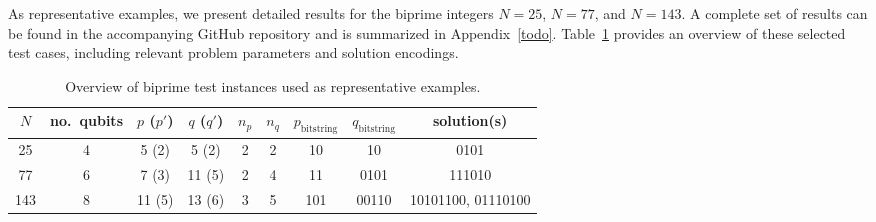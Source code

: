 As representative examples, we present detailed results for the biprime integers $N = 25$, $N = 77$,
and $N = 143$. A complete set of results can be found in the accompanying GitHub repository
and is summarized in Appendix~\ref{todo}. Table~\ref{tab:instances_overview} provides an overview of
these selected test cases, including relevant problem parameters and solution encodings.
\begin{table}[h]
    \centering
    \begin{tabular}{@{}ccccccccc@{}}
        \toprule
        $N$ & no.\ qubits & $p$ ($p'$) & $q$ ($q'$) & $n_p$ & $n_q$ & $p_\mathrm{bitstring}$ & $q_\mathrm{bitstring}$ & solution(s) \\
        \midrule
        25  & 4          & 5 (2)      & 5 (2)      & 2     & 2     & 10                     & 10                     & 0101                  \\
        77  & 6          & 7 (3)      & 11 (5)     & 2     & 4     & 11                     & 0101                   & 111010                \\
        143 & 8          & 11 (5)     & 13 (6)     & 3     & 5     & 101                    & 00110                  & 10101100, 01110100    \\
        \bottomrule
    \end{tabular}
    \caption{Overview of biprime test instances used as representative examples.}
    \label{tab:instances_overview}
\end{table}

